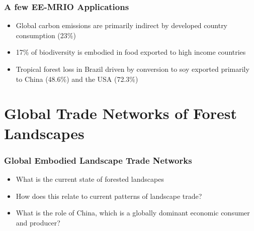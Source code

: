 \documentclass[aspectratio=169]{beamer}
\begin{document}
\begin{frame}
  \frametitle{A few EE-MRIO Applications}
  \begin{itemize}
  \item Global carbon emissions are primarily indirect by developed
  country consumption (23\%) \cite{LIDDLE201871} \pause
  \item 17\% of biodiversity is embodied in food exported to
  high income countries \cite{CHAUDHARY2016195}  \pause
  \item Tropical forest loss in Brazil driven by conversion to soy
  exported primarily to China (48.6\%) and the USA (72.3\%) \cite{Schaffer-Smith2018}
  \end{itemize}
\end{frame}




\section{Global Trade Networks of Forest Landscapes}



\begin{frame}
  \frametitle{Global Embodied Landscape Trade Networks}
  \begin{itemize}
  \item What is the current state of forested landscapes \pause
  \item How does this relate to current patterns of landscape trade? \pause
  \item What is the role of China, which is a globally dominant
  economic consumer and producer?
  \end{itemize}
\end{frame}
\end{document}
